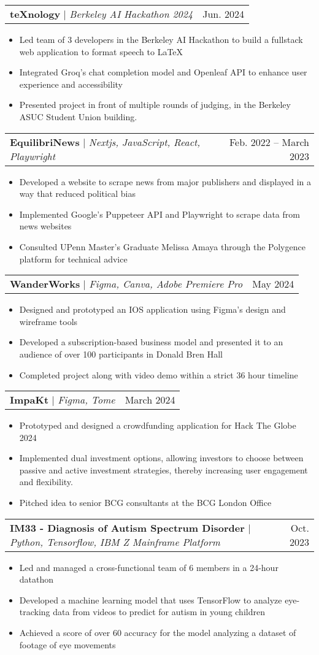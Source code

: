 \documentclass[letterpaper,11pt]{article}
\makeatletter
\newcommand{\resumeItem}[1]{
  \item\small{
    {#1 \vspace{-2pt}}
  }
}
\newcommand{\resumeProjectHeading}[2]{
    \item
    \begin{tabular*}{0.97\textwidth}{l@{\extracolsep{\fill}}r}
      \small#1 & #2 \\
    \end{tabular*}\vspace{-7pt}
}
\newcommand{\resumeItemListStart}{\begin{itemize}}
\newcommand{\resumeItemListEnd}{\end{itemize}\vspace{-5pt}}
\makeatother
\begin{document}
         \resumeProjectHeading
          {\textbf{teXnology} $|$ \emph{Berkeley AI Hackathon 2024}}{Jun. 2024}
          \resumeItemListStart
            \resumeItem{Led team of 3 developers in the Berkeley AI Hackathon to build a fullstack web application to format speech to LaTeX}
            \resumeItem{Integrated Groq’s chat completion model and Openleaf API to enhance user experience and accessibility}
            \resumeItem{Presented project in front of multiple rounds of judging, in the Berkeley ASUC Student Union building.}
          \resumeItemListEnd
     \resumeProjectHeading
          {\textbf{EquilibriNews} $|$ \emph{Nextjs, JavaScript, React, Playwright}}{Feb. 2022 --  March 2023}
          \resumeItemListStart
            \resumeItem{Developed a website to scrape news from major publishers and displayed in a way that reduced political bias}
            \resumeItem{Implemented Google's Puppeteer API and Playwright to scrape data from news websites}
            \resumeItem{Consulted UPenn Master's Graduate Melissa Amaya through the Polygence platform for technical advice}
          \resumeItemListEnd
          
      \resumeProjectHeading
          {\textbf{WanderWorks} $|$ \emph{Figma, Canva, Adobe Premiere Pro}}{May 2024}
          \resumeItemListStart
            \resumeItem{Designed and prototyped an IOS application using Figma's design and wireframe tools}
            \resumeItem{Developed a subscription-based business model and presented it to an audience of over 100 participants in Donald Bren Hall }
            \resumeItem{Completed project along with video demo within a strict 36 hour timeline}
          \resumeItemListEnd

      \resumeProjectHeading
          {\textbf{ImpaKt} $|$ \emph{Figma, Tome}}{March 2024}
          \resumeItemListStart
            \resumeItem{Prototyped and designed a crowdfunding application for Hack The Globe 2024}
            \resumeItem{Implemented dual investment options, allowing investors to choose between passive and active investment strategies, thereby increasing user engagement and flexibility.}
            \resumeItem{Pitched idea to senior BCG consultants at the BCG London Office}
          \resumeItemListEnd

      \resumeProjectHeading
          {\textbf{IM33 - Diagnosis of Autism Spectrum Disorder} $|$ \emph{Python, Tensorflow, IBM Z Mainframe Platform}}{Oct. 2023}
          \resumeItemListStart
            \resumeItem{Led and managed a cross-functional team of 6 members in a 24-hour datathon}
            \resumeItem{Developed a machine learning model that uses TensorFlow to analyze eye-tracking data from videos to predict for autism in young children}
            \resumeItem{Achieved a score of over 60 accuracy for the model analyzing a dataset of footage of eye movements}
          \resumeItemListEnd
          
\end{document}

